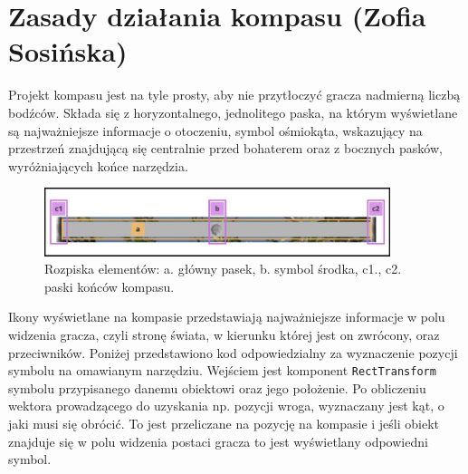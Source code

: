 
\section{Zasady działania kompasu (Zofia Sosińska)}\label{chap:naw}

Projekt kompasu jest na tyle prosty, aby nie przytłoczyć gracza nadmierną liczbą bodźców. Składa się z horyzontalnego, jednolitego paska,
 na którym wyświetlane są najważniejsze informacje o otoczeniu, symbol ośmiokąta, wskazujący na przestrzeń znajdującą się centralnie przed bohaterem
  oraz z bocznych pasków, wyróżniających końce narzędzia.

\begin{figure}[htbp]
    \centering
    \includegraphics[width=0.9\textwidth]{images/ui/opis_ekementow_kompasu.png}
    \caption{Rozpiska elementów: a. główny pasek, b. symbol środka, c1., c2. paski końców kompasu.}\label{fig:compass_design}
\end{figure}
\FloatBarrier
Ikony wyświetlane na kompasie przedstawiają najważniejsze informacje w polu widzenia gracza, czyli stronę świata, w kierunku której jest on zwrócony, oraz przeciwników.
Poniżej przedstawiono kod odpowiedzialny za wyznaczenie pozycji symbolu na omawianym narzędziu. Wejściem jest komponent \texttt{RectTransform} symbolu przypisanego
danemu obiektowi oraz jego położenie. Po obliczeniu wektora prowadzącego do uzyskania np. pozycji wroga, wyznaczany jest kąt, o jaki musi się obrócić.
To jest przeliczane na pozycję na kompasie i jeśli obiekt znajduje się w polu widzenia postaci gracza to jest wyświetlany odpowiedni symbol.

